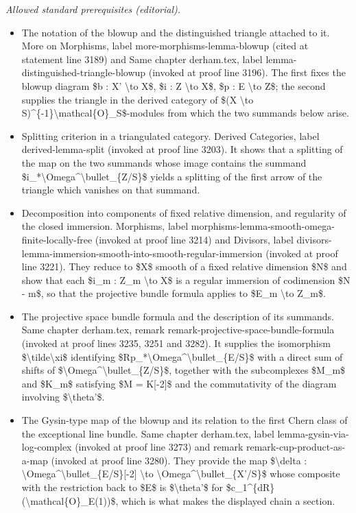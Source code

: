 \documentclass[10pt,a4paper]{amsart}
\theoremstyle{plain}
\theoremstyle{definition}
\theoremstyle{remark}
\numberwithin{equation}{subsection}
\begin{document}
\noindent\textit{Allowed standard prerequisites (editorial).}\begin{itemize}
\item The notation of the blowup and the distinguished triangle attached to it. More on Morphisms, label more-morphisms-lemma-blowup (cited at statement line 3189) and Same chapter derham.tex, label lemma-distinguished-triangle-blowup (invoked at proof line 3196). The first fixes the blowup diagram \$b : X' \textbackslash{}to X\$, \$i : Z \textbackslash{}to X\$, \$p : E \textbackslash{}to Z\$; the second supplies the triangle in the derived category of \$(X \textbackslash{}to S)\textasciicircum{}\{-1\}\textbackslash{}mathcal\{O\}\_S\$-modules from which the two summands below arise.
\item Splitting criterion in a triangulated category. Derived Categories, label derived-lemma-split (invoked at proof line 3203). It shows that a splitting of the map on the two summands whose image contains the summand \$i\_*\textbackslash{}Omega\textasciicircum{}\textbackslash{}bullet\_\{Z/S\}\$ yields a splitting of the first arrow of the triangle which vanishes on that summand.
\item Decomposition into components of fixed relative dimension, and regularity of the closed immersion. Morphisms, label morphisms-lemma-smooth-omega-finite-locally-free (invoked at proof line 3214) and Divisors, label divisors-lemma-immersion-smooth-into-smooth-regular-immersion (invoked at proof line 3221). They reduce to \$X\$ smooth of a fixed relative dimension \$N\$ and show that each \$i\_m : Z\_m \textbackslash{}to X\$ is a regular immersion of codimension \$N - m\$, so that the projective bundle formula applies to \$E\_m \textbackslash{}to Z\_m\$.
\item The projective space bundle formula and the description of its summands. Same chapter derham.tex, remark remark-projective-space-bundle-formula (invoked at proof lines 3235, 3251 and 3282). It supplies the isomorphism \$\textbackslash{}tilde\textbackslash{}xi\$ identifying \$Rp\_*\textbackslash{}Omega\textasciicircum{}\textbackslash{}bullet\_\{E/S\}\$ with a direct sum of shifts of \$\textbackslash{}Omega\textasciicircum{}\textbackslash{}bullet\_\{Z/S\}\$, together with the subcomplexes \$M\_m\$ and \$K\_m\$ satisfying \$M = K[-2]\$ and the commutativity of the diagram involving \$\textbackslash{}theta'\$.
\item The Gysin-type map of the blowup and its relation to the first Chern class of the exceptional line bundle. Same chapter derham.tex, label lemma-gysin-via-log-complex (invoked at proof line 3273) and remark remark-cup-product-as-a-map (invoked at proof line 3280). They provide the map \$\textbackslash{}delta : \textbackslash{}Omega\textasciicircum{}\textbackslash{}bullet\_\{E/S\}[-2] \textbackslash{}to \textbackslash{}Omega\textasciicircum{}\textbackslash{}bullet\_\{X'/S\}\$ whose composite with the restriction back to \$E\$ is \$\textbackslash{}theta'\$ for \$c\_1\textasciicircum{}\{dR\}(\textbackslash{}mathcal\{O\}\_E(1))\$, which is what makes the displayed chain a section.
\end{itemize}\medskip
\end{document}
